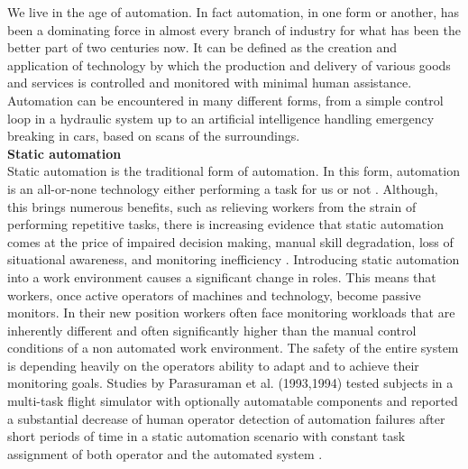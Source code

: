 
We live in the age of automation. In fact automation, in one form or another, has been a dominating force in almost every branch of industry for what has been the better part of two centuries now. It can be defined as the creation and application of technology by which the production and delivery of various goods and services is controlled and monitored with minimal human assistance. Automation can be encountered in many different forms, from a simple control loop in a hydraulic system up to an artificial intelligence handling emergency breaking in cars, based on scans of the surroundings.\\[10pt]
\textbf{Static automation}\\[10pt]
Static automation is the traditional form of automation. In this form, automation is an all-or-none technology either performing a task for us or not \cite{Byrne2006}. 
Although, this brings numerous benefits, such as relieving workers from the strain of performing repetitive tasks, there is increasing evidence that static automation comes at the price of impaired decision making, manual skill degradation, loss of situational awareness, and monitoring inefficiency \cite{Byrne2006}. 
Introducing static automation into a work environment causes a significant change in roles. 
This means that workers, once active operators of machines and technology, become passive monitors. In their new position workers often face monitoring workloads that are inherently different and often significantly higher than the manual control conditions of a non automated work environment. The safety of the entire system is depending heavily on the operators ability to adapt and to achieve their monitoring goals.  
Studies by Parasuraman et al. (1993,1994) tested subjects in a multi-task flight simulator with optionally automatable components and reported a substantial decrease of human operator detection of automation failures after short periods of time in a static automation scenario with constant task assignment of both operator and the automated system \cite{Byrne2006}.
